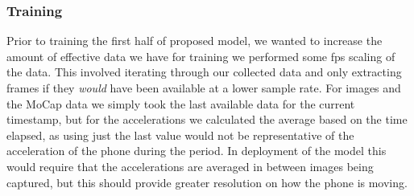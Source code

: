 \subsubsection{Training}\nl
Prior to training the first half of proposed model, we wanted to increase the amount of effective data we have for training we performed some fps scaling of the data. 
This involved iterating through our collected data and only extracting frames if they \textit{would} have been available at a lower sample rate. For images and the MoCap data we simply took the last available data for the current timestamp, but for the accelerations we calculated the average based on the time elapsed, as using just the last value would not be representative of the acceleration of the phone during the period.
In deployment of the model this would require that the accelerations are averaged in between images being captured, but this should provide greater resolution on how the phone is moving.\\
\\





